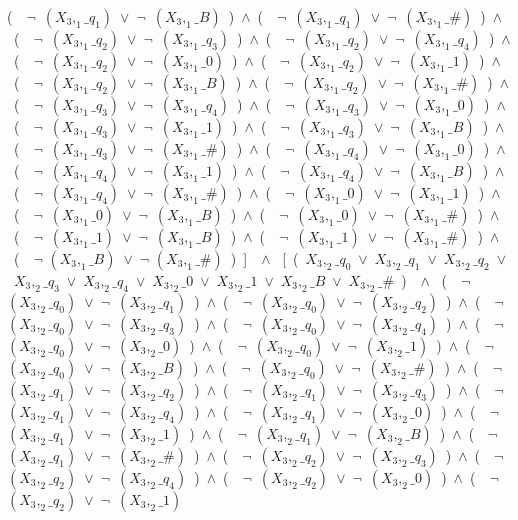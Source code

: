 ﻿\documentclass[a4paper,10pt]{article}
\begin{document}
(\ \ $\neg$\ $(X_3,_1\_q_1)$\ $\vee$\ $\neg$\ $(X_3,_1\_B)$\ )\ $\wedge$\ (\ \ $\neg$\ $(X_3,_1\_q_1)$\ $\vee$\ $\neg$\ $(X_3,_1\_\#)$\ )\ $\wedge$\ (\ \ $\neg$\ $(X_3,_1\_q_2)$\ $\vee$\ $\neg$\ $(X_3,_1\_q_3)$\ )\ $\wedge$\ (\ \ $\neg$\ $(X_3,_1\_q_2)$\ $\vee$\ $\neg$\ $(X_3,_1\_q_4)$\ )\ $\wedge$\ (\ \ $\neg$\ $(X_3,_1\_q_2)$\ $\vee$\ $\neg$\ $(X_3,_1\_0)$\ )\ $\wedge$\ (\ \ $\neg$\ $(X_3,_1\_q_2)$\ $\vee$\ $\neg$\ $(X_3,_1\_1)$\ )\ $\wedge$\ (\ \ $\neg$\ $(X_3,_1\_q_2)$\ $\vee$\ $\neg$\ $(X_3,_1\_B)$\ )\ $\wedge$\ (\ \ $\neg$\ $(X_3,_1\_q_2)$\ $\vee$\ $\neg$\ $(X_3,_1\_\#)$\ )\ $\wedge$\ (\ \ $\neg$\ $(X_3,_1\_q_3)$\ $\vee$\ $\neg$\ $(X_3,_1\_q_4)$\ )\ $\wedge$\ (\ \ $\neg$\ $(X_3,_1\_q_3)$\ $\vee$\ $\neg$\ $(X_3,_1\_0)$\ )\ $\wedge$\ (\ \ $\neg$\ $(X_3,_1\_q_3)$\ $\vee$\ $\neg$\ $(X_3,_1\_1)$\ )\ $\wedge$\ (\ \ $\neg$\ $(X_3,_1\_q_3)$\ $\vee$\ $\neg$\ $(X_3,_1\_B)$\ )\ $\wedge$\ (\ \ $\neg$\ $(X_3,_1\_q_3)$\ $\vee$\ $\neg$\ $(X_3,_1\_\#)$\ )\ $\wedge$\ (\ \ $\neg$\ $(X_3,_1\_q_4)$\ $\vee$\ $\neg$\ $(X_3,_1\_0)$\ )\ $\wedge$\ (\ \ $\neg$\ $(X_3,_1\_q_4)$\ $\vee$\ $\neg$\ $(X_3,_1\_1)$\ )\ $\wedge$\ (\ \ $\neg$\ $(X_3,_1\_q_4)$\ $\vee$\ $\neg$\ $(X_3,_1\_B)$\ )\ $\wedge$\ (\ \ $\neg$\ $(X_3,_1\_q_4)$\ $\vee$\ $\neg$\ $(X_3,_1\_\#)$\ )\ $\wedge$\ (\ \ $\neg$\ $(X_3,_1\_0)$\ $\vee$\ $\neg$\ $(X_3,_1\_1)$\ )\ $\wedge$\ (\ \ $\neg$\ $(X_3,_1\_0)$\ $\vee$\ $\neg$\ $(X_3,_1\_B)$\ )\ $\wedge$\ (\ \ $\neg$\ $(X_3,_1\_0)$\ $\vee$\ $\neg$\ $(X_3,_1\_\#)$\ )\ $\wedge$\ (\ \ $\neg$\ $(X_3,_1\_1)$\ $\vee$\ $\neg$\ $(X_3,_1\_B)$\ )\ $\wedge$\ (\ \ $\neg$\ $(X_3,_1\_1)$\ $\vee$\ $\neg$\ $(X_3,_1\_\#)$\ )\ $\wedge$\ (\ \ $\neg$ $(X_3,_1\_B)$\ $\vee$\ $\neg$ $(X_3,_1\_\#)$\ )\ ]\ \ $\wedge$ \ [\ (\ $X_3,_2\_q_0$\ $\vee$\ $X_3,_2\_q_1$\ $\vee$\ $X_3,_2\_q_2$\ $\vee$\ $X_3,_2\_q_3$\ $\vee$\ $X_3,_2\_q_4$\ $\vee$\ $X_3,_2\_0$\ $\vee$\ $X_3,_2\_1$\ $\vee$\ $X_3,_2\_B$\ $\vee$\ $X_3,_2\_\#$\ )\ \ $\wedge$ \ (\ \ $\neg$\ $(X_3,_2\_q_0)$\ $\vee$\ $\neg$\ $(X_3,_2\_q_1)$\ )\ $\wedge$\ (\ \ $\neg$\ $(X_3,_2\_q_0)$\ $\vee$\ $\neg$\ $(X_3,_2\_q_2)$\ )\ $\wedge$\ (\ \ $\neg$\ $(X_3,_2\_q_0)$\ $\vee$\ $\neg$\ $(X_3,_2\_q_3)$\ )\ $\wedge$\ (\ \ $\neg$\ $(X_3,_2\_q_0)$\ $\vee$\ $\neg$\ $(X_3,_2\_q_4)$\ )\ $\wedge$\ (\ \ $\neg$\ $(X_3,_2\_q_0)$\ $\vee$\ $\neg$\ $(X_3,_2\_0)$\ )\ $\wedge$\ (\ \ $\neg$\ $(X_3,_2\_q_0)$\ $\vee$\ $\neg$\ $(X_3,_2\_1)$\ )\ $\wedge$\ (\ \ $\neg$\ $(X_3,_2\_q_0)$\ $\vee$\ $\neg$\ $(X_3,_2\_B)$\ )\ $\wedge$\ (\ \ $\neg$\ $(X_3,_2\_q_0)$\ $\vee$\ $\neg$\ $(X_3,_2\_\#)$\ )\ $\wedge$\ (\ \ $\neg$\ $(X_3,_2\_q_1)$\ $\vee$\ $\neg$\ $(X_3,_2\_q_2)$\ )\ $\wedge$\ (\ \ $\neg$\ $(X_3,_2\_q_1)$\ $\vee$\ $\neg$\ $(X_3,_2\_q_3)$\ )\ $\wedge$\ (\ \ $\neg$\ $(X_3,_2\_q_1)$\ $\vee$\ $\neg$\ $(X_3,_2\_q_4)$\ )\ $\wedge$\ (\ \ $\neg$\ $(X_3,_2\_q_1)$\ $\vee$\ $\neg$\ $(X_3,_2\_0)$\ )\ $\wedge$\ (\ \ $\neg$\ $(X_3,_2\_q_1)$\ $\vee$\ $\neg$\ $(X_3,_2\_1)$\ )\ $\wedge$\ (\ \ $\neg$\ $(X_3,_2\_q_1)$\ $\vee$\ $\neg$\ $(X_3,_2\_B)$\ )\ $\wedge$\ (\ \ $\neg$\ $(X_3,_2\_q_1)$\ $\vee$\ $\neg$\ $(X_3,_2\_\#)$\ )\ $\wedge$\ (\ \ $\neg$\ $(X_3,_2\_q_2)$\ $\vee$\ $\neg$\ $(X_3,_2\_q_3)$\ )\ $\wedge$\ (\ \ $\neg$\ $(X_3,_2\_q_2)$\ $\vee$\ $\neg$\ $(X_3,_2\_q_4)$\ )\ $\wedge$\ (\ \ $\neg$\ $(X_3,_2\_q_2)$\ $\vee$\ $\neg$\ $(X_3,_2\_0)$\ )\ $\wedge$\ (\ \ $\neg$\ $(X_3,_2\_q_2)$\ $\vee$\ $\neg$\ $(X_3,_2\_1)$\ 
\end{document}
